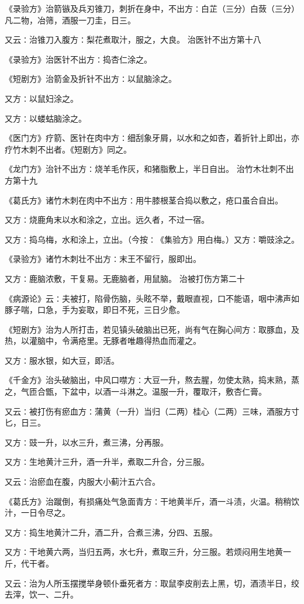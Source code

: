 \documentclass[a4paper,12pt,UTF8,twoside]{ctexbook}
\begin{document}
《录验方》治箭镞及兵刃锥刀，刺折在身中，不出方∶白芷（三分）白蔹（三分）凡二物，冶筛，酒服一刀圭，日三。

又云∶治锥刀入腹方∶梨花煮取汁，服之，大良。
治医针不出方第十八

《录验方》治医针不出方∶捣杏仁涂之。

《短剧方》治箭金及折针不出方∶以鼠脑涂之。

又方∶以鼠妇涂之。

又方∶以蝼蛄脑涂之。

《医门方》疗箭、医针在肉中方∶细刮象牙屑，以水和之如杏，着折针上即出，亦疗竹木刺不出者。《短剧方》同之。

《龙门方》治针不出方∶烧羊毛作灰，和猪脂敷上，半日自出。
治竹木壮刺不出方第十九

《葛氏方》诸竹木刺在肉中不出方∶用牛膝根茎合捣以敷之，疮口虽合自出。

又方∶烧鹿角末以水和涂之，立出。远久者，不过一宿。

又方∶捣乌梅，水和涂上，立出。（今按∶《集验方》用白梅。）又方∶嚼豉涂之。

《录验方》诸竹木刺壮不出方∶末王不留行，服即出。

又方∶鹿脑浓敷，干复易。无鹿脑者，用鼠脑。
治被打伤方第二十

《病源论》云∶夫被打，陷骨伤脑，头眩不举，戴眼直视，口不能语，咽中沸声如豚子喘，口急，手为妄取，即日不死，三日少愈。

《短剧方》治为人所打击，若见镇头破脑出已死，尚有气在胸心间方∶取豚血，及热，以灌脑中，令满疮里。无豚者唯趣得热血而灌之。

又方∶服水银，如大豆，即活。

《千金方》治头破脑出，中风口噤方∶大豆一升，熬去腥，勿使太熟，捣末熟，蒸之，气匝合甑，下盆中，以酒一斗淋之。温服一升，覆取汗，敷杏仁膏。

又云∶被打伤有瘀血方∶蒲黄（一升）当归（二两）桂心（二两）三味，酒服方寸匕，日三。

又方∶豉一升，以水三升，煮三沸，分再服。

又方∶生地黄汁三升，酒一升半，煮取二升合，分三服。

又云∶治瘀血在腹，内服大小蓟汁五六合。

《葛氏方》治蹴倒，有损痛处气急面青方∶干地黄半斤，酒一斗渍，火温。稍稍饮汁，一日令尽之。

又方∶捣生地黄汁二升，酒二升，合煮三沸，分四、五服。

又方∶干地黄六两，当归五两，水七升，煮取三升，分三服。若烦闷用生地黄一斤，代干者。

又云∶治为人所玉摆搅举身顿仆垂死者方∶取鼠李皮削去上黑，切，酒渍半日，绞去滓，饮一、二升。
\end{document}
